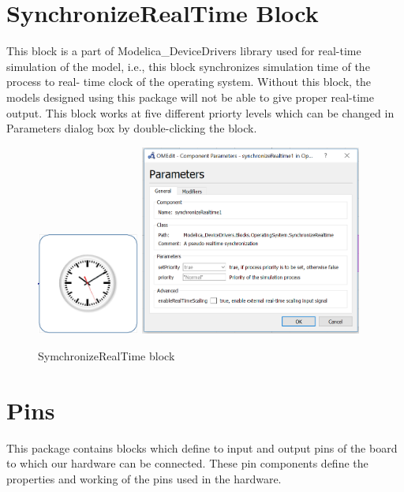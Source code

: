\documentclass[12pt,a4paper]{report}
\begin{document}
\section{SynchronizeRealTime Block}
This block is a part of Modelica\_DeviceDrivers library used for real-time simulation of the model, i.e., this block synchronizes simulation time of the process to real- time clock of the operating system. Without this block, the models designed using this package will not be able to give proper real-time output. This block works at five different priorty levels which can be changed in Parameters dialog box by double-clicking the block.

\begin{figure}[H]
\centering
\includegraphics[width = 0.3\textwidth]{realtime}
\includegraphics[width = 0.65\textwidth]{realtimepara}
\caption{SymchronizeRealTime block}
\label{figure:2}
\end{figure}

\section{Pins}
This package contains blocks which define to input and output pins of the board to which our hardware can be connected. These pin components define the properties and working of the pins used in the hardware.\\
\end{document}
